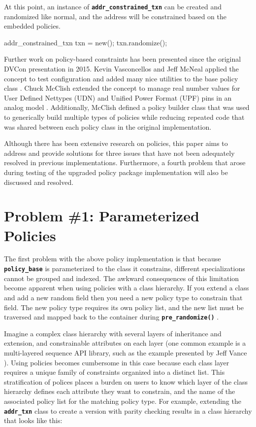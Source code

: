 \documentclass[conference,onecolumn]{IEEEtran}
\newcommand{\code}[1]{
\textbf{\texttt{#1}}
}
\begin{document}
At this point, an instance of \code{addr_constrained_txn} can be created and randomized like normal, and the address will be constrained based on the embedded policies.

{\begin{svcode}
addr_constrained_txn txn = new();
txn.randomize();
\end{svcode}
\captionof{figure}{Randomizing an instance of \code{addr_constrained_txn}}}

Further work on policy-based constraints has been presented since the original DVCon presentation in 2015. Kevin Vasconcellos and Jeff McNeal applied the concept to test configuration and added many nice utilities to the base policy class \cite{b3}. Chuck McClish extended the concept to manage real number values for User Defined Nettypes (UDN) and Unified Power Format (UPF) pins in an analog model \cite{b4}. Additionally, McClish defined a policy builder class that was used to generically build multiple types of policies while reducing repeated code that was shared between each policy class in the original implementation.

Although there has been extensive research on policies, this paper aims to address and provide solutions for three issues that have not been adequately resolved in previous implementations. Furthermore, a fourth problem that arose during testing of the upgraded policy package implementation will also be discussed and resolved.

\section{Problem \#1: Parameterized Policies}

The first problem with the above policy implementation is that because \code{policy_base} is parameterized to the class it constrains, different specializations cannot be grouped and indexed. The awkward consequences of this limitation become apparent when using policies with a class hierarchy. If you extend a class and add a new random field then you need a new policy type to constrain that field. The new policy type requires its own policy list, and the new list must be traversed and mapped back to the container during \code{pre_randomize()}.

Imagine a complex class hierarchy with several layers of inheritance and extension, and constrainable attributes on each layer (one common example is a multi-layered sequence API library, such as the example presented by Jeff Vance \cite{b5}). Using policies becomes cumbersome in this case because each class layer requires a unique family of constraints organized into a distinct list.  This stratification of polices places a burden on users to know which layer of the class hierarchy defines each attribute they want to constrain, and the name of the associated policy list for the matching policy type.  For example, extending the \code{addr_txn} class to create a version with parity checking results in a class hierarchy that looks like this:
\end{document}
